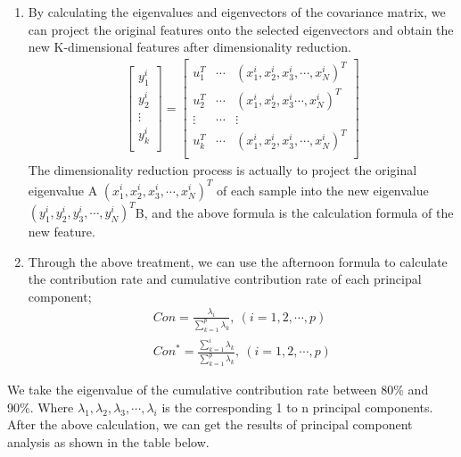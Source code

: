 \begin{enumerate}[\bfseries 1.]
    \item By calculating the eigenvalues and eigenvectors of the covariance matrix, we can project the original features onto the selected eigenvectors and obtain the new K-dimensional features after dimensionality reduction.
    \begin{align}
      \left[ \begin{array}{c}
	    y_{1}^{i}\\
	    y_{2}^{i}\\
	    \vdots\\
	    y_{k}^{i}\\
        \end{array} \right] =\left[ \begin{matrix}
	    u_{1}^{T}&		\cdots&		\left( x_{1}^{i},x_{2}^{i},x_{3}^{i},\cdots ,x_{N}^{i} \right) ^T\\
	    u_{2}^{T}&		\cdots&		\left( x_{1}^{i},x_{2}^{i},x_{3}^{i}\cdots ,x_{N}^{i} \right) ^T\\
	    \vdots   &		\cdots&		\vdots\\
	    u_{k}^{T}&		\cdots&		\left( x_{1}^{i},x_{2}^{i},x_{3}^{i},\cdots ,x_{N}^{i} \right) ^T\\
        \end{matrix} \right] 
    \end{align}    
    The dimensionality reduction process is actually to project the original eigenvalue A $\left( x_{1}^{i},x_{2}^{i},x_{3}^{i},\cdots ,x_{N}^{i} \right) ^T$ of each sample into the new eigenvalue $\left( y_{1}^{i},y_{2}^{i},y_{3}^{i},\cdots ,y_{N}^{i} \right) ^T$B, and the above formula is the calculation formula of the new feature.
    \item Through the above treatment, we can use the afternoon formula to calculate the contribution rate and cumulative contribution rate of each principal component;
    \begin{align}
        Con=\frac{\lambda _i}{\sum_{k=1}^p{\lambda _k}},\ \left( i=1,2,\cdots ,p \right) \\
        Con^*=\frac{\sum_{k=1}^i{\lambda _k}}{\sum_{k=1}^p{\lambda _k}},\ \left( i=1,2,\cdots ,p \right) 
    \end{align}
\end{enumerate}

We take the eigenvalue of the cumulative contribution rate between 80\% and 90\%. Where $\lambda _1,\lambda _2,\lambda _3,\cdots ,\lambda _i$ is the corresponding 1 to n principal components.
After the above calculation, we can get the results of principal component analysis as shown in the table below.

